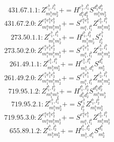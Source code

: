 \documentclass[letterpaper,10pt,fleqn,leqno,onecolumn]{article}
\begin{document}
\begin{equation} \;\;\;\;\;\;  431.67.1.1: Z^{e_{1}^{b},l_{1}^{b}}_{m_{1}^{b}m_{2}^{b}}+=H^{e_{1}^{b},l_{1}^{b}}_{d_{1}^{b}d_{2}^{b}}S^{d_{1}^{b}d_{2}^{b}}_{m_{1}^{b}m_{2}^{b}} \end{equation}
\begin{equation} \;\;\;\;\;\;  431.67.2.0: Z^{e_{1}^{a}e_{1}^{b}e_{2}^{b}}_{m_{1}^{a}m_{1}^{b}m_{2}^{b}}+=S^{e_{1}^{a}e_{1}^{b}}_{m_{1}^{a},l_{1}^{b}}Z^{e_{2}^{b},l_{1}^{b}}_{m_{1}^{b}m_{2}^{b}} \end{equation}
\begin{equation} \;\;\;\;\;\;  273.50.1.1: Z^{e_{1}^{b},l_{1}^{b}}_{m_{1}^{b}m_{2}^{b}}+=H^{l_{1}^{b},l_{2}^{b}}_{m_{1}^{b}m_{2}^{b}}S^{e_{1}^{b}}_{l_{2}^{b}} \end{equation}
\begin{equation} \;\;\;\;\;\;  273.50.2.0: Z^{e_{1}^{a}e_{1}^{b}e_{2}^{b}}_{m_{1}^{a}m_{1}^{b}m_{2}^{b}}+=S^{e_{1}^{a}e_{1}^{b}}_{m_{1}^{a},l_{1}^{b}}Z^{e_{2}^{b},l_{1}^{b}}_{m_{1}^{b}m_{2}^{b}} \end{equation}
\begin{equation} \;\;\;\;\;\;  261.49.1.1: Z^{e_{1}^{b},l_{1}^{b}}_{m_{1}^{b}m_{2}^{b}}+=H^{e_{1}^{b},l_{1}^{b}}_{m_{1}^{b},d_{1}^{b}}S^{d_{1}^{b}}_{m_{2}^{b}} \end{equation}
\begin{equation} \;\;\;\;\;\;  261.49.2.0: Z^{e_{1}^{a}e_{1}^{b}e_{2}^{b}}_{m_{1}^{a}m_{1}^{b}m_{2}^{b}}+=S^{e_{1}^{a}e_{1}^{b}}_{m_{1}^{a},l_{1}^{b}}Z^{e_{2}^{b},l_{1}^{b}}_{m_{1}^{b}m_{2}^{b}} \end{equation}
\begin{equation} \;\;\;\;\;\;  719.95.1.2: Z^{l_{1}^{b},l_{2}^{b}}_{m_{1}^{b}m_{2}^{b}}+=H^{l_{1}^{b},l_{2}^{b}}_{d_{1}^{b}d_{2}^{b}}S^{d_{1}^{b}d_{2}^{b}}_{m_{1}^{b}m_{2}^{b}} \end{equation}
\begin{equation} \;\;\;\;\;\;  719.95.2.1: Z^{e_{1}^{b},l_{1}^{b}}_{m_{1}^{b}m_{2}^{b}}+=S^{e_{1}^{b}}_{l_{2}^{b}}Z^{l_{1}^{b},l_{2}^{b}}_{m_{1}^{b}m_{2}^{b}} \end{equation}
\begin{equation} \;\;\;\;\;\;  719.95.3.0: Z^{e_{1}^{a}e_{1}^{b}e_{2}^{b}}_{m_{1}^{a}m_{1}^{b}m_{2}^{b}}+=S^{e_{1}^{a}e_{1}^{b}}_{m_{1}^{a},l_{1}^{b}}Z^{e_{2}^{b},l_{1}^{b}}_{m_{1}^{b}m_{2}^{b}} \end{equation}
\begin{equation} \;\;\;\;\;\;  655.89.1.2: Z^{l_{1}^{b},l_{2}^{b}}_{m_{1}^{b}m_{2}^{b}}+=H^{l_{1}^{b},l_{2}^{b}}_{m_{1}^{b},d_{1}^{b}}S^{d_{1}^{b}}_{m_{2}^{b}} \end{equation}
\end{document}
